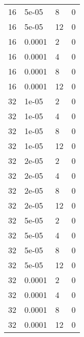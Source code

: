 \documentclass{article}%
\begin{document}
\begin{longtable}{l l l l}
16&5e{-}05&8&0\\%
16&5e{-}05&12&0\\%
16&0.0001&2&0\\%
16&0.0001&4&0\\%
16&0.0001&8&0\\%
16&0.0001&12&0\\%
32&1e{-}05&2&0\\%
32&1e{-}05&4&0\\%
32&1e{-}05&8&0\\%
32&1e{-}05&12&0\\%
32&2e{-}05&2&0\\%
32&2e{-}05&4&0\\%
32&2e{-}05&8&0\\%
32&2e{-}05&12&0\\%
32&5e{-}05&2&0\\%
32&5e{-}05&4&0\\%
32&5e{-}05&8&0\\%
32&5e{-}05&12&0\\%
32&0.0001&2&0\\%
32&0.0001&4&0\\%
32&0.0001&8&0\\%
32&0.0001&12&0\\%
\end{longtable}%
\end{document}
